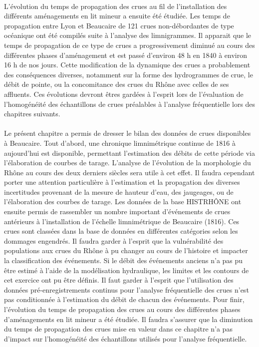 \documentclass[11pt]{article}
\begin{document}
	\paragraph{} L'évolution du temps de propagation des crues au fil de l'installation des différents aménagements en lit mineur a ensuite été étudiée. Les temps de propagation entre Lyon et Beaucaire de 121 crues  non-débordantes de type océanique ont été compilés suite à l'analyse des limnigrammes. Il apparait que le temps de propagation de ce type de crues a progressivement diminué au cours des différentes phases d'aménagement et est passé d'environ 48 h en 1840 à environ 16 h de nos jours. Cette modification de la dynamique des crues a probablement des conséquences diverses, notamment sur la forme des hydrogrammes de crue, le débit de pointe, ou la concomitance des crues du Rhône avec celles de ses affluents. Ces évolutions devront êtres gardées à l'esprit lors de l'évaluation de l'homogénéité des échantillons de crues préalables à l'analyse fréquentielle lors des chapitres suivants. 
	
	\paragraph{} Le présent chapitre a permis de dresser le bilan des données de crues disponibles à Beaucaire. Tout d'abord, une chronique limnimétrique continue de 1816 à aujourd'hui est disponible, permettant l'estimation des débits de cette période via l'élaboration de courbes de tarage. L'analyse de l'évolution de la morphologie du Rhône au cours des deux derniers siècles sera utile à cet effet. Il faudra cependant porter une attention particulière à l'estimation et la propagation des diverses incertitudes provenant de la mesure de hauteur d'eau, des jaugeages, ou de l'élaboration des courbes de tarage. Les données de la base HISTRHÔNE ont ensuite permis de rassembler un nombre important d'événements de crues antérieurs à l'installation de l'échelle limnimétrique de Beaucaire (1816). Ces crues sont classées dans la base de données en différentes catégories selon les dommages engendrés. Il faudra garder à l'esprit que la vulnérabilité des populations aux crues du Rhône à pu changer au cours de l'histoire et impacter la classification des événements. Si le débit des événements anciens n'a pas pu être estimé à l'aide de la modélisation hydraulique, les limites et les contours de cet exercice ont pu être définis. Il faut garder à l'esprit que l'utilisation des données pré-enregistrements continus pour l'analyse fréquentielle des crues n'est pas conditionnée à l'estimation du débit de chacun des événements. Pour finir, l'évolution du temps de propagation des crues au cours des différentes phases d'aménagements en lit mineur a été étudiée. Il faudra s'assurer que la diminution du temps de propagation des crues mise en valeur dans ce chapitre n'a pas d'impact sur l'homogénéité des échantillons utilisés pour l'analyse fréquentielle. 
\end{document}
